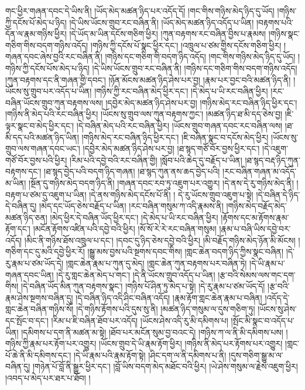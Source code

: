 གང་ཕྱིར་གཞན་དབང་དེ་ཡིས་ནི། །ཡོད་མེད་མཚན་ཉིད་པར་འདོད་དོ། །གང་གིས་གཉིས་མེད་ཉིད་དུ་ཡོད། །གཉིས་ཀྱི་དངོས་པོ་མེད་པ་ཉིད། །དེ་ཡིས་ཡོངས་གྲུབ་རང་བཞིན་ནི། །ཡོད་མེད་མཚན་ཉིད་འདོད་པ་ཡིན། །བརྟགས་པའི་དོན་ལ་རྣམ་གཉིས་ཕྱིར། །དེ་ཡོད་མ་ཡིན་དངོས་གཅིག་ཕྱིར། །ཀུན་བརྟགས་རང་བཞིན་བྱིས་པ་རྣམས། །གཉིས་སྣང་གཅིག་གིས་བདག་གཉིས་འདོད། །གཉིས་ཀྱི་དངོས་པོ་སྣང་ཕྱིར་དང་། །འཁྲུལ་པ་ཙམ་གྱིས་དངོས་གཅིག་ཕྱིར། །གཞན་དབང་ཞེས་བྱའི་རང་བཞིན་ནི། །གཉིས་དང་གཅིག་གི་བདག་ཉིད་འདོད། །གང་གིས་གཉིས་མེད་ཉིད་དུ་ཡོད། །གཉིས་ཀྱི་དངོས་པོས་མེད་པ་ཉིད། །དེ་ཡིས་ཡོངས་གྲུབ་རང་བཞིན་ནི། །གཉིས་དང་གཅིག་གིས་བདག་གཉིས་འདོད། །ཀུན་བརྟགས་དང་ནི་གཞན་གྱི་དབང་། །ཉོན་མོངས་མཚན་ཉིད་ཤེས་པར་བྱ། །རྣམ་པར་བྱང་བའི་མཚན་ཉིད་ནི། །ཡོངས་སུ་གྲུབ་པར་འདོད་པ་ཡིན། །གཉིས་ཀྱི་རང་བཞིན་མེད་ཕྱིར་དང་། །དེ་མེད་པ་ཡི་རང་བཞིན་ཕྱིར། །རང་བཞིན་ཡོངས་གྲུབ་ཀུན་བརྟགས་ལས། །དབྱེར་མེད་མཚན་ཉིད་ཤེས་པར་བྱ། །གཉིས་མེད་རང་བཞིན་ཉིད་ཕྱིར་དང་། །གཉིས་ནི་མེད་པའི་རང་བཞིན་ཕྱིར། །ཡོངས་སུ་གྲུབ་ལས་ཀུན་བརྟགས་ཀྱང་། །མཚན་ཉིད་ཐ་མི་དད་ཅེས་བྱ། །ཇི་ལྟར་སྣང་བ་མེད་ཕྱིར་དང་། །དེ་བཞིན་མེད་པའི་རང་བཞིན་ཕྱིར། །ཡོངས་གྲུབ་གཞན་དབང་རང་བཞིན་ལས། །ཐ་མི་དད་པའི་མཚན་ཉིད་ཡིན། །གཉིས་མེད་རང་བཞིན་ཉིད་ཕྱིར་དང་། །ཇི་བཞིན་སྣང་བ་དངོས་མེད་ཕྱིར། །ཡོངས་སུ་གྲུབ་ལས་གཞན་དབང་ཡང་། །དབྱེར་མེད་མཚན་ཉིད་ཤེས་པར་བྱ། །ཐ་སྙད་གཙོ་བོར་བྱས་ཕྱིར་དང་། །དེ་འཇུག་གཙོ་བོར་བྱས་པའི་ཕྱིར། །རིམ་པའི་དབྱེ་བའི་རང་བཞིན་གྱི། །སློབ་པའི་ཆེད་དུ་བརྗོད་པ་ཡིན། །ཐ་སྙད་བརྡ་ཉིད་ཀུན་བརྟགས་དང་། །ཐ་སྙད་བྱེད་པའི་བདག་ཉིད་གཞན། །ཐ་སྙད་ཀུན་ནས་ཆད་བྱེད་པའི། །རང་བཞིན་གཞན་མ་འདོད་མ་ཡིན། །སྔོན་དུ་གཉིས་མེད་བདག་ཉིད་ནི། །གཞན་དབང་རབ་ཏུ་འཇུག་པར་འགྱུར། །དེ་ནས་དེ་རུ་གཉིས་མེད་ནི། །བརྟག་པ་ཙམ་དུ་འཇུག་པ་ཡིན། །དེ་ནས་གཉིས་མེད་དངོས་པོ་ནི། །
དེ་རུ་ཡོངས་གྲུབ་འཇུག་པ་སྟེ། །དེ་བཞིན་དེ་ཉིད་དེ་བཞིན་དུ། །མེད་དང་ཡོད་ཅེས་བརྗོད་པ་ཡིན། །རང་བཞིན་གསུམ་ཀ་འདི་རྣམས་ནི། །གཉིས་མེད་བརྗོད་མེད་མཚན་ཉིད་ཅན། །མེད་ཕྱིར་དེ་བཞིན་ཡོད་ཕྱིར་དང་། །དེ་མེད་པ་ཡི་རང་བཞིན་ཕྱིར། །རྟོགས་དང་མ་རྟོགས་རྣམ་རྟོག་དང་། །མངོན་རྟོགས་འཛིན་པའི་དབྱེ་བའི་ཕྱིར། །སོ་སོ་རེ་རེ་རང་བཞིན་གསུམ། །རྣམ་པ་བཞི་ཡིས་དབྱེ་བར་འདོད། །མིང་ནི་གཉིས་ཐོས་འཁྲུལ་པ་དང་། །དབང་དུ་ཉིད་ཅེས་དབྱེ་བའི་ཕྱིར། །མི་བརྗོད་གཉིས་མེད་ཉོན་མི་མོངས། །གཅིག་དང་དུ་མའི་དབྱེ་ཕྱིར་རོ། །སྒྱུ་མས་བྱས་པའི་སྔགས་དབང་གིས། །གླང་ཆེན་བདག་ཉིད་ཀྱིས་སྣང་བཞིན། །དེ་རུ་རྣམ་པ་ཙམ་ཡོད་དེ། །གླང་ཆེན་རྣམ་པ་ཀུན་དུ་མེད། །གླང་ཆེན་ཀུན་བརྟགས་པར་བཞིན་ཏེ། །དེ་ཡི་རྣམ་པ་གཞན་དབང་ཡིན། །དེ་རུ་གླང་ཆེན་མེད་པ་གང་། །དེ་ནི་ཡོངས་གྲུབ་འདོད་པ་ཡིན། །རྩ་བའི་སེམས་ལས་གང་དག་གིས། །དེ་བཞིན་ཡོད་མིན་ཀུན་བརྟགས་སྣང་། །གཉིས་པོ་ཤིན་ཏུ་མེད་པ་སྟེ། །དེ་རུ་རྣམ་པ་ཙམ་ཡོད་དོ། །རྩ་བའི་རྣམ་ཤེས་སྔགས་བཞིན་དུ། །དེ་བཞིན་ཉིད་འདི་ཤིང་བཞིན་འདོད། །རྣམ་རྟོག་གླང་ཆེན་རྣམ་པ་བཞིན། །འདོད་དེ་གླང་ཆེན་བཞིན་གཉིས་སོ། །དེ་གཉིས་རྟོགས་པའི་དུས་སུ་ནི། །མཚན་ཉིད་གསུམ་ལ་དུས་གཅིག་ཏུ། །ཡོངས་སུ་ཤེས་དང་སྤོང་བ་དང་། །རིམ་པ་ཇི་བཞིན་ཐོབ་པར་འདོད། །ཡོངས་ཤེས་འདི་རུ་མི་དམིགས་པ། །སྤོང་མི་སྣང་བ་འདོད་པ་ཡིན། །དམིགས་པ་དག་ནི་མཚན་མ་སྟེ། །ཐོབ་པར་མངོན་སུམ་བྱ་བའང་དེ། །གཉིས་ཀ་ལ་ནི་མི་དམིགས་པས། །གཉིས་ཀྱི་རྣམ་པར་རྟོག་པར་འགྱུར། །ཡོངས་གྲུབ་དེ་ཡི་རྣམ་རྟོག་ཕྱིར། །གཉིས་ནི་མེད་པར་རྟོགས་པར་འགྱུར། །གླང་པོ་ཆེ་ནི་མི་དམིགས་དང་། །དེ་ཡི་རྣམ་པའི་རྣམ་རྟོག་སྟེ། །ཤིང་དག་ལ་ནི་དམིགས་པ་ནི། །དུས་གཅིག་སྒྱུ་མ་ལ་བཞིན་དུ། །གཉེན་པོ་བློ་ནི་སྒྱུར་ཕྱིར་དང་། །བློ་ཡིས་བདག་མེད་མཐོང་བའི་ཕྱིར། །ཡེ་ཤེས་གསུམ་ལ་རྗེས་འཇུག་ཕྱིར། །འབད་པ་མེད་པར་ཐར་པ་ཐོབ། །
